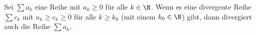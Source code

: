 Sei $\sum a_k$ eine Reihe mit $a_k \geq 0$ für alle $k \in \N$. Wenn es eine divergente Reihe $\sum c_k$ mit $a_k \geq c_k \geq 0$ für alle $k \geq k_0$ (mit einem $k_0 \in \N$) gibt, dann divergiert auch die Reihe $\sum a_k$.